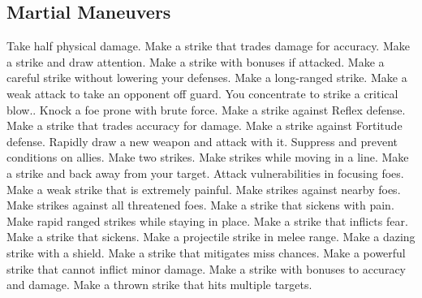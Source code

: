 \subsection{Martial Maneuvers}\label{Martial Maneuvers}
\begin{spelllist}
 Take half physical damage.
 Make a strike that trades damage for accuracy.
 Make a strike and draw attention.
 Make a strike with bonuses if attacked.
 Make a careful strike without lowering your defenses.
 Make a long-ranged strike.
 Make a weak attack to take an opponent off guard.
 You concentrate to strike a critical blow..
 Knock a foe prone with brute force.
 Make a strike against Reflex defense.
 Make a strike that trades accuracy for damage.
 Make a strike against Fortitude defense.
 Rapidly draw a new weapon and attack with it.
 Suppress and prevent conditions on allies.
 Make two strikes.
 Make strikes while moving in a line.
 Make a strike and back away from your target.
 Attack vulnerabilities in focusing foes.
 Make a weak strike that is extremely painful.
 Make strikes against nearby foes.
 Make strikes against all threatened foes.
 Make a strike that sickens with pain.
 Make rapid ranged strikes while staying in place.
 Make a strike that inflicts fear.
 Make a strike that sickens.
 Make a projectile strike in melee range.
 Make a dazing strike with a shield.
 Make a strike that mitigates miss chances.
 Make a powerful strike that cannot inflict minor damage.
 Make a strike with bonuses to accuracy and damage.
 Make a thrown strike that hits multiple targets.
\end{spelllist}



